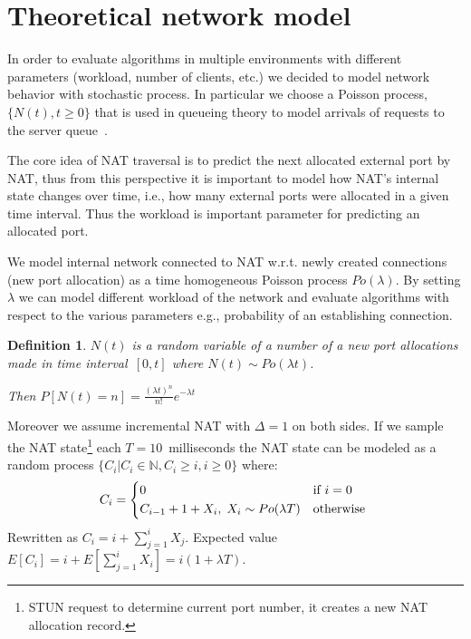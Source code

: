 \documentclass{llncs}
\newtheorem{mydef}{Definition}
\begin{document}

\section{Theoretical network model}
In order to evaluate algorithms in multiple environments with different parameters (workload, number of clients, etc.)
we decided to model network behavior with stochastic process. In particular we choose a Poisson process, $\{N(t), t\geq0\}$ 
that is used in queueing theory to model arrivals of requests to the server queue~\citep{Nelson:1995:PSP:207382}. 

The core idea of NAT traversal is to predict the next allocated external port by NAT, thus from this perspective 
it is important to model how NAT's internal state changes over time, i.e., how many external ports 
were allocated in a given time interval. Thus the workload is important parameter for predicting an allocated port.

We model internal network connected to NAT w.r.t. newly created connections (new port allocation) as a 
time homogeneous Poisson process $Po(\lambda)$. By setting $\lambda$ we can model 
different workload of the network and evaluate algorithms with respect to the various parameters e.g., 
probability of an establishing connection. 


\begin{mydef}
$N(t)$ is a random variable of a number of a new port allocations made in time 
interval~$[0,t]$ where $N(t) \sim Po(\lambda t)$. \\ 
                                                      
\begin{center}                                                     
Then $P[N(t)=n] = \frac{(\lambda t)^n}{n!} e^{-\lambda t}$
\end{center}
\end{mydef}

Moreover we assume incremental NAT with $\Delta=1$ on both sides. If we sample the NAT 
state\footnote{STUN request to determine current port number, it creates a new NAT allocation record.}
each $T=10$~milliseconds the NAT state can be modeled as a random process $\{C_i | C_i \in \mathbb{N}, C_i \geq i, i\geq0\}$ where:
\[
C_i = \begin{dcases*}
         0 & if $i=0$ \\
         C_{i-1} + 1 + X_i, \; X_i \sim Po(\lambda T) & otherwise 
        \end{dcases*}
\]
Rewritten as $C_i = i + \sum_{j=1}^{i}X_j$. Expected value $E[C_i] = i + E[\sum_{j=1}^{i}X_i] = i (1+\lambda T)$.
\end{document}
